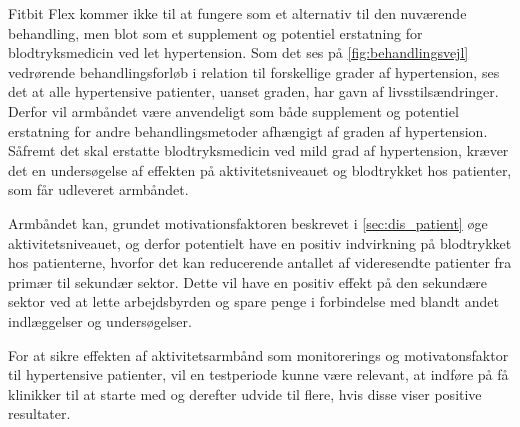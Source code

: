 Fitbit Flex kommer ikke til at fungere som et alternativ til den nuværende behandling, men blot som et supplement og potentiel erstatning for blodtryksmedicin ved let hypertension. Som det ses på \autoref{fig:behandlingsvejl} vedrørende behandlingsforløb i relation til forskellige grader af hypertension, ses det at alle hypertensive patienter, uanset graden, har gavn af livsstilsændringer. Derfor vil armbåndet være anvendeligt som både supplement og potentiel erstatning for andre behandlingsmetoder afhængigt af graden af hypertension. Såfremt det skal erstatte blodtryksmedicin ved mild grad af hypertension, kræver det en undersøgelse af effekten på aktivitetsniveauet og blodtrykket hos patienter, som får udleveret armbåndet.

Armbåndet kan, grundet motivationsfaktoren beskrevet i \autoref{sec:dis_patient} øge aktivitetsniveauet, og derfor potentielt have en positiv indvirkning på blodtrykket hos patienterne, hvorfor det kan reducerende antallet af videresendte patienter fra primær til sekundær sektor. Dette vil have en positiv effekt på den sekundære sektor ved at lette arbejdsbyrden og spare penge i forbindelse med blandt andet indlæggelser og undersøgelser.

For at sikre effekten af aktivitetsarmbånd som monitorerings og motivatonsfaktor til hypertensive patienter, vil en testperiode kunne være relevant, at indføre på få klinikker til at starte med og derefter udvide til flere, hvis disse viser positive resultater.